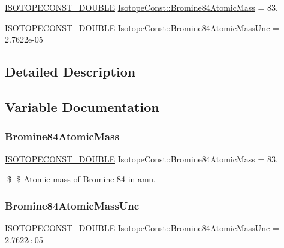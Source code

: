 \begin{DoxyCompactItemize}
\item 
\mbox{\hyperlink{group___isotope_const-_macros_ga8f45a7272ce02c0b4c65c44636ed719a}{I\+S\+O\+T\+O\+P\+E\+C\+O\+N\+S\+T\+\_\+\+D\+O\+U\+B\+LE}} \mbox{\hyperlink{group___isotope_const-_bromine-_br84_ga2ced516d985e6ffdb1edec8acaed6e70}{Isotope\+Const\+::\+Bromine84\+Atomic\+Mass}} = 83.
\item 
\mbox{\hyperlink{group___isotope_const-_macros_ga8f45a7272ce02c0b4c65c44636ed719a}{I\+S\+O\+T\+O\+P\+E\+C\+O\+N\+S\+T\+\_\+\+D\+O\+U\+B\+LE}} \mbox{\hyperlink{group___isotope_const-_bromine-_br84_gaec0bd1c213b65ea5daec086880c95f3f}{Isotope\+Const\+::\+Bromine84\+Atomic\+Mass\+Unc}} = 2.\+7622e-\/05
\end{DoxyCompactItemize}


\subsection{Detailed Description}


\subsection{Variable Documentation}
\mbox{\label{group___isotope_const-_bromine-_br84_ga2ced516d985e6ffdb1edec8acaed6e70}} 
\subsubsection{\texorpdfstring{Bromine84\+Atomic\+Mass}{Bromine84AtomicMass}}
{\footnotesize\ttfamily \mbox{\hyperlink{group___isotope_const-_macros_ga8f45a7272ce02c0b4c65c44636ed719a}{I\+S\+O\+T\+O\+P\+E\+C\+O\+N\+S\+T\+\_\+\+D\+O\+U\+B\+LE}} Isotope\+Const\+::\+Bromine84\+Atomic\+Mass = 83.}

\$ \$ Atomic mass of Bromine-\/84 in amu. \mbox{\label{group___isotope_const-_bromine-_br84_gaec0bd1c213b65ea5daec086880c95f3f}} 
\subsubsection{\texorpdfstring{Bromine84\+Atomic\+Mass\+Unc}{Bromine84AtomicMassUnc}}
{\footnotesize\ttfamily \mbox{\hyperlink{group___isotope_const-_macros_ga8f45a7272ce02c0b4c65c44636ed719a}{I\+S\+O\+T\+O\+P\+E\+C\+O\+N\+S\+T\+\_\+\+D\+O\+U\+B\+LE}} Isotope\+Const\+::\+Bromine84\+Atomic\+Mass\+Unc = 2.\+7622e-\/05}

